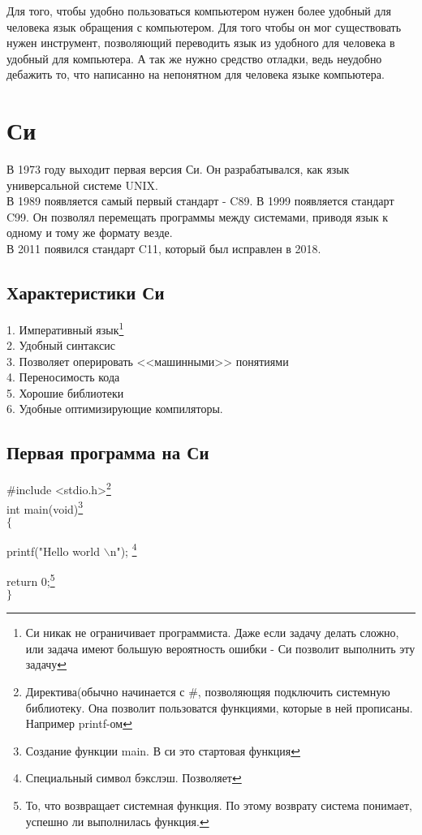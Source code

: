 \documentclass[a4paper,12pt]{article}
\begin{document}
Для того, чтобы удобно пользоваться компьютером нужен более удобный для человека язык обращения с компьютером. Для того чтобы он мог существовать нужен инструмент, позволяющий переводить язык из удобного для человека в удобный для компьютера. А так же нужно средство отладки, ведь неудобно дебажить то, что написанно на непонятном для человека языке компьютера.

\section{Си}
В 1973 году выходит первая версия Си. Он разрабатывался, как язык универсальной системе UNIX.\\
В 1989 появляется самый первый стандарт - C89.
В 1999 появляется стандарт C99. Он позволял перемещать программы между системами, приводя язык к одному и тому же формату везде.\\
В 2011 появился стандарт C11, который был исправлен в 2018.

\subsection{Характеристики Си}
1. Императивный язык\footnote{Си никак не ограничивает программиста. Даже если задачу делать сложно, или задача имеют большую вероятность ошибки - Си позволит выполнить эту задачу}\\
2. Удобный синтаксис\\
3. Позволяет оперировать <<машинными>> понятиями\\
4. Переносимость кода\\
5. Хорошие библиотеки\\
6. Удобные оптимизирующие компиляторы.\\
\subsection{Первая программа на Си}
$\#$include <stdio.h>\footnote{Директива(обычно начинается с $\#$, позволяющяя подключить системную библиотеку. Она позволит пользоватся функциями, которые в ней прописаны. Например printf-ом}\\
int main(void)\footnote{Создание функции main. В си это стартовая функция}\\
$\{$

printf("Hello world $\backslash$n"); \footnote{Специальный символ бэкслэш. Позволяет }

return 0;\footnote{То, что возвращает системная функция. По этому возврату система понимает, успешно ли выполнилась функция.}\\
$\}$
\end{document}
